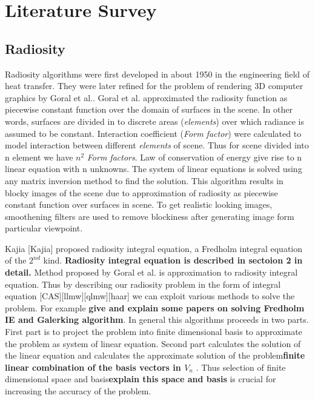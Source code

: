 \chapter{Literature Survey}
\section{Radiosity}


Radiosity algorithms were first developed in about 1950 in the engineering field of heat transfer. They were later refined for the problem of rendering 3D computer graphics by Goral et al.\cite{Goral}. Goral et al. approximated the radiosity function as piecewise constant function over the domain of surfaces in the scene. In other words, surfaces are divided in to discrete areas ({\em elements}) over which radiance is assumed to be constant. Interaction coefficient ({\em Form factor}) were calculated to model interaction between different {\em elements} of scene. Thus for scene divided into n element we have $n^2$  {\em Form factors}. Law of conservation of energy give rise to n linear equation with n unknowns. The system of linear equations is solved using any matrix inversion method to find the solution. This algorithm results in blocky images of the scene due to approximation of radiosity as piecewise constant function over surfaces in scene. To get realistic looking images, smoothening filters are used to remove blockiness after generating image form particular viewpoint. 

Kajia [Kajia] proposed radiosity integral equation, a Fredholm integral equation of the $2^{nd}$ kind. { \bf Radiosity integral equation is described in sectoion 2 in detail.} Method proposed by Goral et al. \cite{Goral} is approximation to radiosity integral equation. Thus by describing  our radiosity problem in the form of integral equation [CAS][llmw][qlmw][haar] we can exploit various methods to solve the problem. For example  {\bf give and explain some papers on solving Fredholm IE and Galerking algorithm}. In general this algorithms proceeds in two parts. First part is to project the problem into finite dimensional basis to approximate the problem as system of linear equation. Second part calculates the solution of the linear equation and calculates the approximate solution of the problem{\bf  finite linear combination of the basis vectors in  $V_n$ }. Thus selection of finite dimensional space and basis{\bf explain this space and basis} is crucial for increasing the accuracy of the problem.

